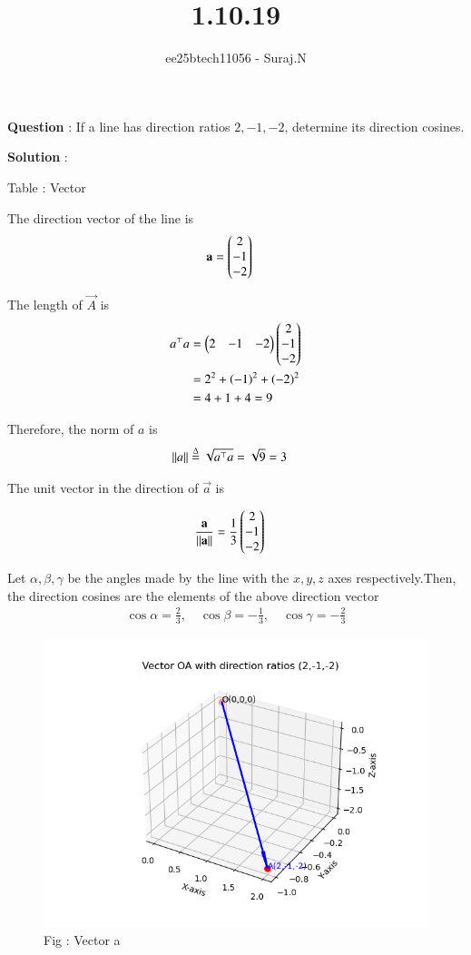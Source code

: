 \documentclass[journal,12pt,onecolumn]{IEEEtran}
\theoremstyle{remark}
\begin{document}
\title{1.10.19}
\author{ee25btech11056 - Suraj.N}
\maketitle
\renewcommand{\thefigure}{\theenumi}
\renewcommand{\thetable}{\theenumi}

\textbf{Question} : If a line has direction ratios $2,-1,-2$, determine its direction cosines. 

\textbf{Solution} : 

\begin{table}[h!]
  \centering
  
  \caption*{Table : Vector}
  \label{1.10.19}
\end{table}

The direction vector of the line is
\begin{align*}
\mathbf{a} &= \begin{pmatrix}2\\-1\\-2\end{pmatrix}
\end{align*}

The length of $\vec{A}$ is
\begin{align*}
a^\top a &= \begin{pmatrix}2 & -1 & -2\end{pmatrix}\begin{pmatrix}2\\-1\\-2\end{pmatrix} \\
&= 2^2 + \left(-1\right)^2 + \left(-2\right)^2 \\
&= 4 + 1 + 4 = 9
\end{align*}

Therefore, the norm of $a$ is
\begin{align*}
\left\lVert a\right\rVert &\overset{\Delta}{=} \sqrt{a^\top a} = \sqrt{9} = 3
\end{align*} 

The unit vector in the direction of $\vec{a}$ is  

\begin{align*} 
\frac{\mathbf{a}}{\left\lVert\mathbf{a}\right\rVert}
&= \frac{1}{3}\begin{pmatrix}2\\-1\\-2\end{pmatrix}
\end{align*}

Let $\alpha,\beta,\gamma$ be the angles made by the line with the $x,y,z$ axes respectively.Then, the direction cosines are the elements of the above direction vector
\begin{align*}
\cos\alpha = \frac{2}{3}, \quad
\cos\beta = -\frac{1}{3}, \quad
\cos\gamma = -\frac{2}{3}
\end{align*}

\pagebreak

\begin{figure}[h!]
  \centering
  \includegraphics[width=0.9\columnwidth]{figs/fig_vector.png} 
   \caption*{Fig : Vector a}
  \label{Fig1}
\end{figure}
\end{document}
